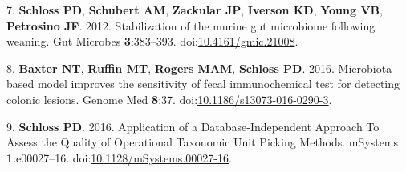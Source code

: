 \documentclass[
  11pt,
]{article}
\newenvironment{cslreferences}%
  {}%
  {\par}
\begin{document}
\begin{cslreferences}
\leavevmode\hypertarget{ref-schloss_stabilization_2012}{}%
7. \textbf{Schloss PD}, \textbf{Schubert AM}, \textbf{Zackular JP},
\textbf{Iverson KD}, \textbf{Young VB}, \textbf{Petrosino JF}. 2012.
Stabilization of the murine gut microbiome following weaning. Gut
Microbes \textbf{3}:383--393.
doi:\href{https://doi.org/10.4161/gmic.21008}{10.4161/gmic.21008}.

\leavevmode\hypertarget{ref-baxter_microbiota-based_2016}{}%
8. \textbf{Baxter NT}, \textbf{Ruffin MT}, \textbf{Rogers MAM},
\textbf{Schloss PD}. 2016. Microbiota-based model improves the
sensitivity of fecal immunochemical test for detecting colonic lesions.
Genome Med \textbf{8}:37.
doi:\href{https://doi.org/10.1186/s13073-016-0290-3}{10.1186/s13073-016-0290-3}.

\leavevmode\hypertarget{ref-schloss_application_2016}{}%
9. \textbf{Schloss PD}. 2016. Application of a Database-Independent
Approach To Assess the Quality of Operational Taxonomic Unit Picking
Methods. mSystems \textbf{1}:e00027--16.
doi:\href{https://doi.org/10.1128/mSystems.00027-16}{10.1128/mSystems.00027-16}.
\end{cslreferences}
\end{document}
